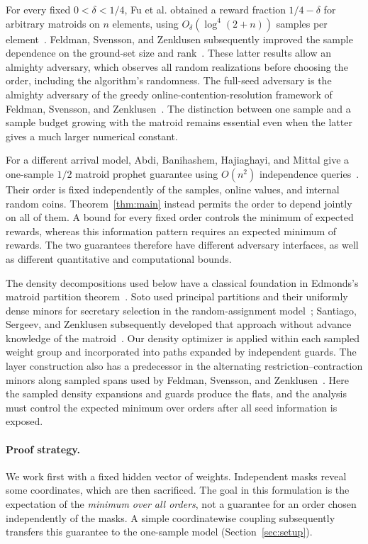 For every fixed $0<\delta<1/4$, Fu et al. obtained a reward fraction
$1/4-\delta$ for arbitrary matroids on $n$ elements, using
$O_\delta(\log^4(2+n))$ samples per element~\cite{FLTWWZ24}.
Feldman, Svensson, and Zenklusen subsequently improved the sample dependence
on the ground-set size and rank~\cite{FSZ26}. These latter results allow
an almighty adversary, which observes all random realizations before
choosing the order, including the algorithm's randomness.
The full-seed adversary is the almighty adversary of the greedy
online-contention-resolution framework of Feldman, Svensson, and
Zenklusen~\cite[Section 1.1]{FSZ16}. The distinction between one sample
and a sample budget growing with the matroid remains essential even when
the latter gives a much larger numerical constant.

For a different arrival model, Abdi, Banihashem, Hajiaghayi, and Mittal
give a one-sample $1/2$ matroid prophet guarantee using $O(n^2)$
independence queries~\cite[Theorem 1.3]{ABHM26}. Their order is fixed
independently of the samples, online values, and internal random coins.
Theorem~\ref{thm:main} instead permits the order to depend jointly on all
of them. A bound for every fixed order controls the minimum of expected
rewards, whereas this information pattern requires an expected minimum
of rewards. The two guarantees therefore have different adversary
interfaces, as well as different quantitative and computational bounds.

The density decompositions used below have a classical foundation in
Edmonds's matroid partition theorem~\cite{Edmonds65}. Soto used principal
partitions and their uniformly dense minors for secretary selection in
the random-assignment model~\cite{Soto13}; Santiago, Sergeev, and Zenklusen
subsequently developed that approach without advance knowledge of the
matroid~\cite{SSZ25}. Our density optimizer is applied within each sampled
weight group and incorporated into paths expanded by independent guards.
The layer construction also has a predecessor in the alternating
restriction--contraction minors along sampled spans used by Feldman,
Svensson, and Zenklusen~\cite[Section 3]{FSZ15}. Here the sampled
density expansions and guards produce the flats, and the analysis must
control the expected minimum over orders after all seed information is
exposed.

\paragraph{Proof strategy.}
We work first with a fixed hidden vector of weights. Independent masks
reveal some coordinates, which are then sacrificed. The goal in this
formulation is the expectation of the \emph{minimum over all orders},
not a guarantee for an order chosen independently of the masks. A simple
coordinatewise coupling subsequently transfers this guarantee to the
one-sample model (Section~\ref{sec:setup}).

